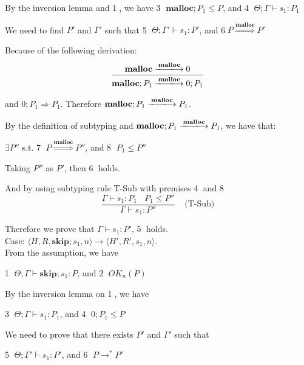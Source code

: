 \documentclass[english]{jssst_ppl} %
\newcommand\SKIP{\mathbf{skip}}
\newcommand\Rtab{\; \; \; \;}
\newcommand\Malloc{\mathbf{malloc}}
\theoremstyle{definition}
\begin{document}
By the inversion lemma and \textcircled{1}, we have \textcircled{3} $\Malloc;P_{1} \le P$, and \textcircled{4} $\Theta; \Gamma \vdash s_{1} : P_{1}$

We need to find $P'$ and $\Gamma'$ such that \textcircled{5} $\Theta; \Gamma' \vdash s_{1} : P'$, and \textcircled{6}$P \overset{\text{$\Malloc$}}{\Longrightarrow} P'$

Because of the following derivation:
$$
  \frac{ \Malloc \xlongrightarrow{\Malloc} 0}
  {\Malloc;P_{1} \xlongrightarrow{\Malloc} 0;P_{1}}
$$

and $0;P_{1} \Rightarrow P_{1}$. Therefore $\Malloc;P_{1} \xlongrightarrow{\Malloc} P_{1}$.

By the definition of subtyping and $\Malloc;P_{1} \xlongrightarrow{\Malloc} P_{1}$, we have that:
\begin{center}
$\exists P''$ s.t. \textcircled{7} $P \overset{\text{$\Malloc$}}{\Longrightarrow} P''$, and \textcircled{8} $P_{1} \le P''$
 \end{center}

Taking $P''$ as $P'$, then \textcircled{6} holds.

And by using subtyping rule T-Sub with premises \textcircled{4} and \textcircled{8}
$$
    \frac{\Gamma \vdash s_{1} : P_{1} \ \ \ \ P_{1} \le P''}
     {\Gamma \vdash s_{1} : P''}
     \Rtab \mbox{(T-Sub)}
$$

Therefore we prove that $\Gamma \vdash s_{1} : P'$, \textcircled{5} holds.\\

\noindent Case: $\langle H, R, \SKIP;s_{1}, n \rangle \rightarrow \langle H', R', s_{1}, n \rangle $. \\

From the assumption, we have
\begin{center}
\textcircled{1} $\Theta; \Gamma \vdash \SKIP;s_{1} : P$, and \textcircled{2} $OK_{n}(P)$
\end{center}

By the inversion lemma on \textcircled{1}, we have
\begin{center}
\textcircled{3} $\Theta; \Gamma \vdash s_{1} : P_{1}$, and \textcircled{4} $0;P_{1} \le P $
\end{center}

We need to prove that there exists $P'$ and $\Gamma'$ such that
\begin{center}
\textcircled{5} $\Theta; \Gamma' \vdash s_{1} : P'$, and \textcircled{6} $P \rightarrow^{*} P'$
\end{center}
\end{document}
